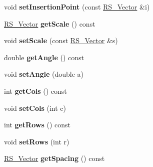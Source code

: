 \begin{DoxyCompactItemize}
\item 
\hypertarget{classRS__Insert_aeda72c17b6b8cd7f3e5aeaaa333672fe}{void {\bfseries set\-Insertion\-Point} (const \hyperlink{classRS__Vector}{R\-S\-\_\-\-Vector} \&i)}\label{classRS__Insert_aeda72c17b6b8cd7f3e5aeaaa333672fe}

\item 
\hypertarget{classRS__Insert_acc66b5b0026ea52424acca2205aa717f}{\hyperlink{classRS__Vector}{R\-S\-\_\-\-Vector} {\bfseries get\-Scale} () const }\label{classRS__Insert_acc66b5b0026ea52424acca2205aa717f}

\item 
\hypertarget{classRS__Insert_a24375391bdc11f6ce86eff58fca51429}{void {\bfseries set\-Scale} (const \hyperlink{classRS__Vector}{R\-S\-\_\-\-Vector} \&s)}\label{classRS__Insert_a24375391bdc11f6ce86eff58fca51429}

\item 
\hypertarget{classRS__Insert_a938af1d02746d91a91e1cec92a5a9f08}{double {\bfseries get\-Angle} () const }\label{classRS__Insert_a938af1d02746d91a91e1cec92a5a9f08}

\item 
\hypertarget{classRS__Insert_afa6df5443af2b03a0ecddbbb77756879}{void {\bfseries set\-Angle} (double a)}\label{classRS__Insert_afa6df5443af2b03a0ecddbbb77756879}

\item 
\hypertarget{classRS__Insert_ab7934660299c3b8ff26bd6f052245048}{int {\bfseries get\-Cols} () const }\label{classRS__Insert_ab7934660299c3b8ff26bd6f052245048}

\item 
\hypertarget{classRS__Insert_a70edb865e7acfff9943de62a46fc92ee}{void {\bfseries set\-Cols} (int c)}\label{classRS__Insert_a70edb865e7acfff9943de62a46fc92ee}

\item 
\hypertarget{classRS__Insert_a16da8b0b633ceffbcdfcf6d505f6283b}{int {\bfseries get\-Rows} () const }\label{classRS__Insert_a16da8b0b633ceffbcdfcf6d505f6283b}

\item 
\hypertarget{classRS__Insert_a9453ae294cd1d3f6c8a065dd3bea37e8}{void {\bfseries set\-Rows} (int r)}\label{classRS__Insert_a9453ae294cd1d3f6c8a065dd3bea37e8}

\item 
\hypertarget{classRS__Insert_a8a91d60b8f1618b45421491fbdded888}{\hyperlink{classRS__Vector}{R\-S\-\_\-\-Vector} {\bfseries get\-Spacing} () const }\label{classRS__Insert_a8a91d60b8f1618b45421491fbdded888}


\end{DoxyCompactItemize}
